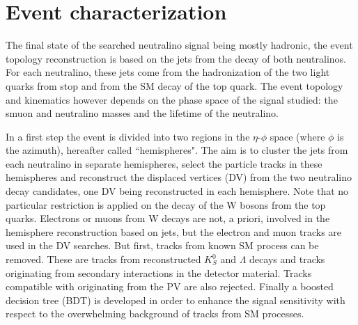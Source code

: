 \documentclass{cernatlasnote}
\newcommand{\Ks}{$K^0_S$\xspace}
\newcommand{\Lam}{$\Lambda$\xspace}
\begin{document}


\section{Event characterization}
\label{SEC: EVTREC}

The final state of the searched neutralino signal being mostly hadronic, the event topology reconstruction is based on the jets from the decay of both neutralinos. For each neutralino, these jets come from the hadronization of the two light quarks from stop and from the SM decay of the top quark. 
The event topology and kinematics however depends on the phase space of the signal studied: the smuon and neutralino masses and the lifetime of the neutralino. 

In a first step the event is divided into two regions in the $\eta$-$\phi$ space (where $\phi$ is the azimuth), hereafter called ``hemispheres".
The aim is to cluster the jets from each neutralino in separate hemispheres, select the particle tracks in these hemispheres and reconstruct the displaced vertices (DV) from the two neutralino decay candidates, one DV being reconstructed in each hemisphere.
Note that no particular restriction is applied on the decay of the W bosons from the top quarks. Electrons or muons from W decays are not, a priori, involved in the hemisphere reconstruction based on jets, but the electron and muon tracks are used in the DV searches.
But first, tracks from known SM process can be removed. These are tracks from reconstructed \Ks and \Lam decays and tracks originating from secondary interactions in the detector material.
Tracks compatible with originating from the PV are also rejected. 
Finally a boosted decision tree (BDT) is developed in order to enhance the signal sensitivity with respect to the overwhelming background of tracks from SM processes. 
\end{document}
